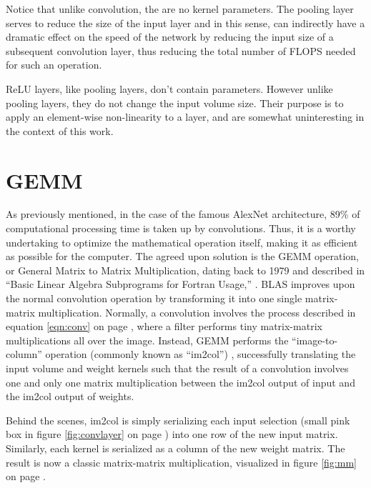 Notice that unlike convolution, the are no kernel parameters. The pooling layer serves to reduce the size of the input layer and in this sense, can indirectly have a dramatic effect on the speed of the network by reducing the input size of a subsequent convolution layer, thus reducing the total number of FLOPS needed for such an operation.

ReLU layers, like pooling layers, don't contain parameters. However unlike pooling layers, they do not change the input volume size. Their purpose is to apply an element-wise non-linearity to a layer, and are somewhat uninteresting in the context of this work.

\section{GEMM}
As previously mentioned, in the case of the famous AlexNet architecture, 89\% of computational processing time is taken up by convolutions. Thus, it is a worthy undertaking to optimize the mathematical operation itself, making it as efficient as possible for the computer. The agreed upon solution is the GEMM operation, or General Matrix to Matrix Multiplication, dating back to 1979 and described in ``Basic Linear Algebra Subprograms for Fortran Usage,'' \cite{BLAS}. BLAS improves upon the normal convolution operation by transforming it into one single matrix-matrix multiplication. Normally, a convolution involves the process described in equation \ref{eqn:conv} on page \pageref{eqn:conv}, where a filter performs tiny matrix-matrix multiplications all over the image. Instead, GEMM performs the ``image-to-column'' operation (commonly known as ``im2col'') \cite{im2col}, successfully translating the input volume and weight kernels such that the result of a convolution involves one and only one matrix multiplication between the im2col output of input and the im2col output of weights.

Behind the scenes, im2col is simply serializing each input selection (small pink box in figure \ref{fig:convlayer} on page \pageref{fig:convlayer}) into one row of the new input matrix. Similarly, each kernel is serialized as a column of the new weight matrix. The result is now a classic matrix-matrix multiplication, visualized in figure \ref{fig:mm} on page \pageref{fig:mm}.


